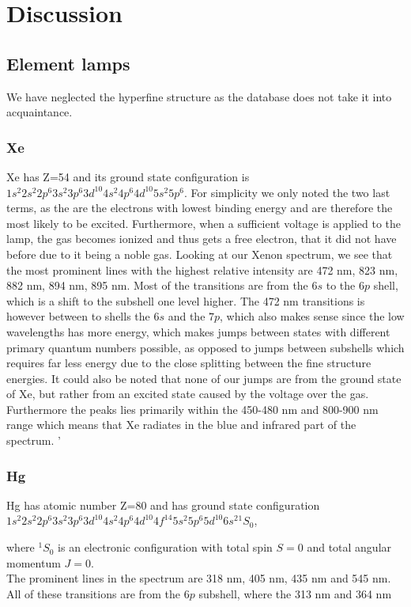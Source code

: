 \section{Discussion}

\subsection{Element lamps}

We have neglected the hyperfine structure as the database does not take it into acquaintance. 

\subsubsection{Xe}

Xe has Z=54 and its ground state configuration is $1s^2 2s^2 2p^6 3s^2 3p^6 3d^10 4s^2 4p^6 4d^10 5s^2 5p^6$. For simplicity we only noted the two last terms, as the are the electrons with lowest binding energy and are therefore the most likely to be excited. Furthermore, when a sufficient voltage is applied to the lamp, the gas becomes ionized and thus gets a free electron, that it did not have before due to it being a noble gas. Looking at our Xenon spectrum, we see that the most prominent lines with the highest relative intensity are 472 nm, 823 nm, 882 nm, 894 nm, 895 nm. Most of the transitions are from the $6s$ to the $6p$ shell, which is a shift to the subshell one level higher. The 472 nm transitions is however between to shells the $6s$ and the $7p$, which also makes sense since the low wavelengths has more energy, which makes jumps between states with different primary quantum numbers possible, as opposed to jumps between subshells which requires far less energy due to the close splitting between the fine structure energies. It could also be noted that none of our jumps are from the ground state of Xe, but rather from an excited state caused by the voltage over the gas. Furthermore the peaks lies primarily within the 450-480 nm and 800-900 nm range which means that Xe radiates in the blue and infrared part of the spectrum. '

\subsubsection{Hg}

Hg has atomic number Z=80 and has ground state configuration $1s^2 2s^2 2p^6 3s^2 3p^6 3d^10 4s^2 4p^6 4d^10 4f^{14}5s^2 5p^6 5d^10 6s^2 {}^1S_0$,

where ${}^1S_{0}$ is an electronic configuration with total spin $S=0$ and total angular momentum $J=0$.\\

The prominent lines in the spectrum are 318 nm, 405 nm, 435 nm and 545 nm. All of these transitions are from the $6p$ subshell, where the 313 nm and 364 nm 